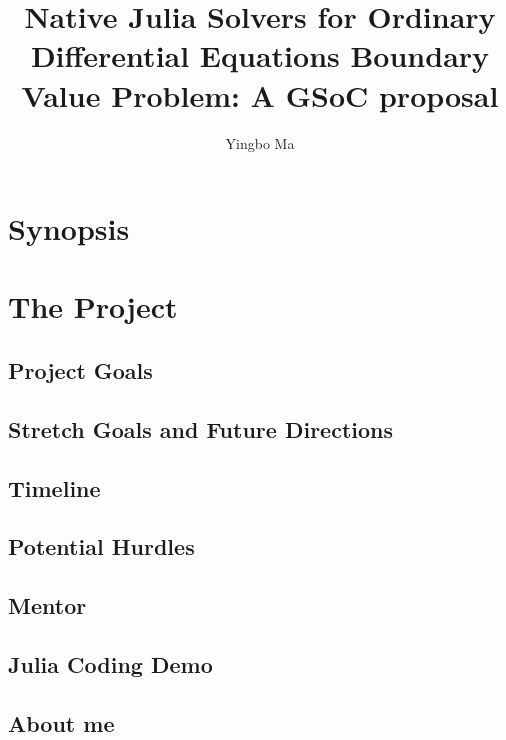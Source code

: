 \documentclass[a4paper,12pt,onecolumn]{article}
\author{Yingbo Ma}
\title{Native Julia Solvers for Ordinary Differential Equations Boundary Value Problem: A GSoC proposal}
\begin{document}
\maketitle
\tableofcontents

\section{Synopsis} %
\label{sec:synopsis}


\section{The Project} %
\label{sec:the_project}

\subsection{Project Goals}

\subsection{Stretch Goals and Future Directions}

\subsection{Timeline}

\subsection{Potential Hurdles} %
\label{sub:potential_hurdles}


\subsection{Mentor} %
\label{sub:mentor}




\subsection{Julia Coding Demo} %
\label{ssub:julia_coding_demo}


\subsection{About me} %
\label{ssub:about_me}
\end{document}
